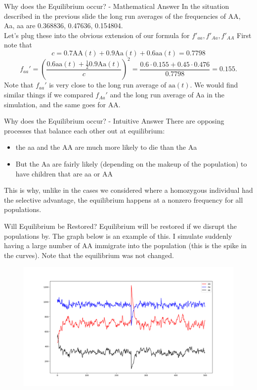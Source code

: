 \documentclass[xcolor=x11names, svgnames, rgb]{beamer}
\newcommand{\dom}{\text{AA}}
\newcommand{\het}{\text{Aa}}
\newcommand{\rec}{\text{aa}}
\begin{document}
\begin{frame}[t]{Why does the Equilibrium occur? - Mathematical Answer}
	In the situation described in the previous slide the long run averages of the frequencies of AA, Aa, aa are 0.368836, 0.47636, 0.154804.\\
	Let's plug these into the obvious extension of our formula for $f'_{aa},f'_{Aa},f'_{AA}$
	First note that $$c = 0.7 \dom(t) + 0.9 \het(t) + 0.6 \rec(t) = 0.7798$$
	$$f_{aa}' = \left(\frac{0.6\rec(t) + \frac{1}{2}0.9\het(t)}{c}\right)^2 = \frac{0.6\cdot 0.155 + 0.45\cdot 0.476}{0.7798} = 0.155.$$
	Note that $f_{aa}'$ is very close to the long run average of $\rec(t)$. We would find similar things if we compared $f_{Aa}'$ and the long run average of Aa in the simulation, and the same goes for AA.
\end{frame}

\begin{frame}[t]{Why does the Equilibrium occur? - Intuitive Answer}
	There are opposing processes that balance each other out at equilibrium:
	\begin{itemize}
		\item the aa and the AA are much more likely to die than the Aa
		\item But the Aa are fairly likely (depending on the makeup of the population) to have children that are aa or AA
	\end{itemize}
	This is why, unlike in the cases we considered where a homozygous individual had the selective advantage, the equilibrium happens at a nonzero frequency for all populations.
\end{frame}

\begin{frame}[t]{Will Equilibrium be Restored?}
	Equilibrium will be restored if we disrupt the populations by. The graph below is an example of this.  I simulate suddenly having a large number of AA immigrate into the population (this is the spike in the curves). Note that the equilibrium was not changed.

\begin{center}
	\begin{figure}
		\includegraphics[width=0.7\linewidth]{sim5.png} 
\end{figure}	
\end{center}	
	
\end{frame}
\end{document}
